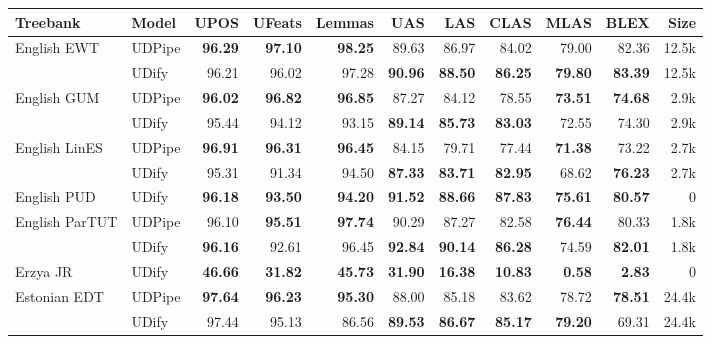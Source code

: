 \documentclass[11pt,a4paper]{article}
\begin{document}
\begin{table*}
    \fontsize{8}{10}\selectfont
    \begin{center}
    \begin{tabular}{@{}llrrrrrrrrr@{}}
    \toprule
    \sc Treebank & \sc Model & \sc UPOS & \sc UFeats & \sc Lemmas & \sc UAS & \sc LAS & \sc CLAS & \sc  MLAS & \sc BLEX & \sc Size \\
    \midrule
    English EWT & UDPipe &  \bf 96.29 &  \bf 97.10 &   \bf 98.25 &      89.63 &      86.97 &      84.02 &      79.00 &      82.36 &  12.5k \\
               & UDify &      96.21 &      96.02 &       97.28 &  \bf 90.96 &  \bf 88.50 &  \bf 86.25 &  \bf 79.80 &  \bf 83.39 &  12.5k \\
    \addlinespace   
    English GUM & UDPipe &  \bf 96.02 &  \bf 96.82 &   \bf 96.85 &      87.27 &      84.12 &      78.55 &  \bf 73.51 &  \bf 74.68 &   2.9k \\
               & UDify &      95.44 &      94.12 &       93.15 &  \bf 89.14 &  \bf 85.73 &  \bf 83.03 &      72.55 &      74.30 &   2.9k \\
    \addlinespace
    English LinES & UDPipe &  \bf 96.91 &  \bf 96.31 &   \bf 96.45 &      84.15 &      79.71 &      77.44 &  \bf 71.38 &      73.22 &   2.7k \\
               & UDify &      95.31 &      91.34 &       94.50 &  \bf 87.33 &  \bf 83.71 &  \bf 82.95 &      68.62 &  \bf 76.23 &   2.7k \\
    \addlinespace
    English PUD & UDify &  \bf 96.18 &  \bf 93.50 &   \bf 94.20 &  \bf 91.52 &  \bf 88.66 &  \bf 87.83 &  \bf 75.61 &  \bf 80.57 &      0 \\
    \addlinespace
    English ParTUT & UDPipe &      96.10 &  \bf 95.51 &   \bf 97.74 &      90.29 &      87.27 &      82.58 &  \bf 76.44 &      80.33 &   1.8k \\
               & UDify &  \bf 96.16 &      92.61 &       96.45 &  \bf 92.84 &  \bf 90.14 &  \bf 86.28 &      74.59 &  \bf 82.01 &   1.8k \\
    \addlinespace
    Erzya JR & UDify &  \bf 46.66 &  \bf 31.82 &   \bf 45.73 &  \bf 31.90 &  \bf 16.38 &  \bf 10.83 &   \bf 0.58 &   \bf 2.83 &      0 \\
    \addlinespace
    Estonian EDT & UDPipe &  \bf 97.64 &  \bf 96.23 &   \bf 95.30 &      88.00 &      85.18 &      83.62 &      78.72 &  \bf 78.51 &  24.4k \\
               & UDify &      97.44 &      95.13 &       86.56 &  \bf 89.53 &  \bf 86.67 &  \bf 85.17 &  \bf 79.20 &      69.31 &  24.4k \\

\end{tabular}
\end{center}
\end{table*}
\end{document}
